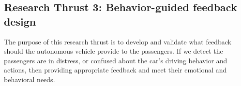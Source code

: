 \subsection{Research Thrust 3: Behavior-guided feedback design}
\label{sec:feedback}

The purpose of this research thrust is to develop and validate what feedback should the autonomous vehicle provide to the passengers.
If we detect the passengers are in distress, or confused about the car's driving behavior and actions, then providing appropriate feedback and meet their emotional and behavioral needs. 
